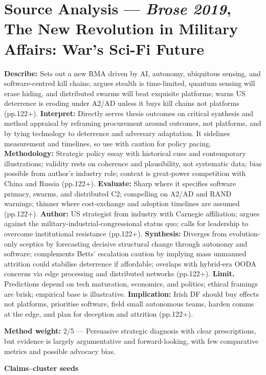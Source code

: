 \section*{Source Analysis — \textit{Brose 2019}, The New Revolution in Military Affairs: War’s Sci-Fi Future}
\textbf{Describe:} Sets out a new RMA driven by AI, autonomy, ubiquitous sensing, and software-centred kill chains; argues stealth is time-limited, quantum sensing will erase hiding, and distributed swarms will beat exquisite platforms; warns US deterrence is eroding under A2/AD unless it buys kill chains not platforms (pp.122+).
\textbf{Interpret:} Directly serves thesis outcomes on critical synthesis and method appraisal by reframing procurement around outcomes, not platforms, and by tying technology to deterrence and adversary adaptation. It sidelines measurement and timelines, so use with caution for policy pacing.
\textbf{Methodology:} Strategic policy essay with historical cues and contemporary illustrations; validity rests on coherence and plausibility, not systematic data; bias possible from author’s industry role; context is great-power competition with China and Russia (pp.122+).
\textbf{Evaluate:} Sharp where it specifies software primacy, swarms, and distributed C2; compelling on A2/AD and RAND warnings; thinner where cost-exchange and adoption timelines are assumed (pp.122+).
\textbf{Author:} US strategist from industry with Carnegie affiliation; argues against the military-industrial-congressional status quo; calls for leadership to overcome institutional resistance (pp.122+).
\textbf{Synthesis:} Diverges from evolution-only sceptics by forecasting decisive structural change through autonomy and software; complements Betts’ escalation caution by implying mass unmanned attrition could stabilise deterrence if affordable; overlaps with hybrid-era OODA concerns via edge processing and distributed networks (pp.122+).
\textbf{Limit.} Predictions depend on tech maturation, economics, and politics; ethical framings are brisk; empirical base is illustrative.
\textbf{Implication:} Irish DF should buy effects not platforms, prioritise software, field small autonomous teams, harden comms at the edge, and plan for deception and attrition (pp.122+).

\textbf{Method weight:} 2/5 — Persuasive strategic diagnosis with clear prescriptions, but evidence is largely argumentative and forward-looking, with few comparative metrics and possible advocacy bias.

\textbf{Claims–cluster seeds}

